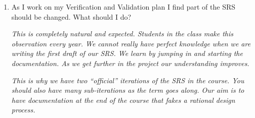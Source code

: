 \documentclass[12pt]{article}
\begin{document}
\begin{enumerate}
\item As I work on my Verification and Validation plan I find part of the SRS
  should be changed.  What should I do? \medskip

  \emph{This is completely natural and expected.  Students in the class make
    this observation every year.  We cannot really have perfect knowledge when
    we are writing the first draft of our SRS. We learn by jumping in and
    starting the documentation. As we get further in the project our
    understanding improves.}

  \emph{This is why we have two ``official'' iterations of the SRS in the
    course. You should also have many sub-iterations as the term goes along. Our
    aim is to have documentation at the end of the course that fakes a rational
    design process.}

\end{enumerate}
\end{document}

